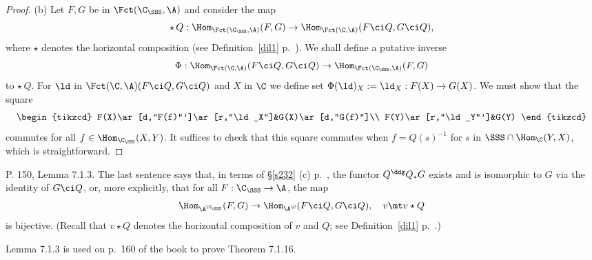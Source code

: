 \documentclass[12pt]{article}
\theoremstyle{remark}
\theoremstyle{definition}
\begin{document}
\begin{s}
\begin{proof}
\nn(b) %
Let $F,G$ be in $\Fct(\C_\SSS,\A)$ and consider the map 
$$
\star\,Q:\Hom_{\Fct(\C_\SSS,\A)}(F,G)\to\Hom_{\Fct(\C,\A)}(F\ci Q,G\ci Q),
$$ 
where $\star$ denotes the horizontal composition (see Definition~\ref{dil1} p.~). We shall define a putative inverse 
$$
\Phi:\Hom_{\Fct(\C,\A)}(F\ci Q,G\ci Q)\to\Hom_{\Fct(\C_\SSS,\A)}(F,G)
$$ 
to $\star\,Q$. For $\ld$ in $\Fct(\C,\A)(F\ci Q,G\ci Q)$ and $X$ in $\C$ we define set $\Phi(\ld)_X:=\ld_X:F(X)\to G(X)$. We must show that the square 
$$
\begin{tikzcd}
F(X)\ar[d,"F(f)"']\ar[r,"\ld_X"]&G(X)\ar[d,"G(f)"]\\ 
F(Y)\ar[r,"\ld_Y"']&G(Y)
\end{tikzcd} 
$$ 
commutes for all $f\in\Hom_{\C_\SSS}(X,Y)$. It suffices to check that this square commutes when $f=Q(s)^{-1}$ for $s$ in $\SSS\cap\Hom_\C(Y,X)$, which is straightforward.
\end{proof}
\end{s}




\begin{s}
P. 150, Lemma 7.1.3. The last sentence says that, in terms of \S\ref{s232} (c) p.~, the functor $Q^\ddg Q_*G$ exists and is isomorphic to $G$ via the identity of $G\ci Q$, or, more explicitly, that for all $F:\C_\SSS\to\A$, the map 
$$
\Hom_{\A^{\C_\SSS}}(F,G)\to\Hom_{\A^\C}(F\ci Q,G\ci Q),\quad v\mt v\star Q
$$ 
is bijective. (Recall that $v\star Q$ denotes the horizontal composition of $v$ and $Q$; see Definition~\ref{dil1} p.~.)

Lemma 7.1.3 is used on p.~160 of the book to prove Theorem 7.1.16. %
\end{s}
\end{document}
